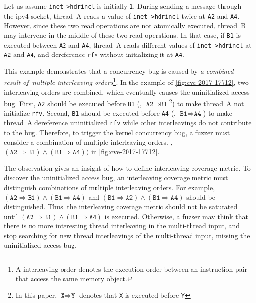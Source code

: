 Let us assume \texttt{inet->hdrincl} is initially \texttt{1}.
%
During sending a message through the ipv4 socket, thread~A reads a
value of \texttt{inet->hdrincl} twice at \texttt{A2} and \texttt{A4}.
%
However, since these two read operations are not atomically executed,
thread~B may intervene in the middle of these two read operations.
%
In that case, if \texttt{B1} is executed between \texttt{A2} and
\texttt{A4}, thread~A reads different values of \texttt{inet->hdrincl}
at \texttt{A2} and \texttt{A4}, and dereference \texttt{rfv} without
initializing it at \texttt{A4}.


%
This example demonstrates that a concurrency bug is caused by \textit{a combined
  result of multiple interleaving orders}\footnote{A interleaving order
denotes the execution order between an instruction pair that access
the same memory object.}.
%
In the example of \autoref{fig:cve-2017-17712}, two interleaving orders
are combined, which eventually causes the uninitialized access bug.
%
First, \texttt{A2} should be executed before \texttt{B1} (\ie,
$\texttt{A2} \Rightarrow \texttt{B1}$\footnote{In this paper,
  $\texttt{X} \Rightarrow \texttt{Y}$ denotes that \texttt{X} is
  executed before \texttt{Y}}) to make thread~A not initialize
\texttt{rfv}.
%
Second, \texttt{B1} should be executed before \texttt{A4} (\ie,
$\texttt{B1} \Rightarrow \texttt{A4}$) to make thread~A dereference
uninitialized \texttt{rfv} while other interleavings do not 
contribute to the bug.
%
Therefore, to trigger the kernel concurrency bug, a fuzzer must
consider a combination of multiple interleaving orders. \eg, 
$(\texttt{A2} \Rightarrow \texttt{B1}) \wedge (\texttt{B1} \Rightarrow
\texttt{A4}))$ in \autoref{fig:cve-2017-17712}.


The observation gives an insight of how to define interleaving coverage metric.
To discover the uninitialized access bug, 
an interleaving coverage metric must distinguish combinations of multiple interleaving orders.
%
For example, $(\texttt{A2} \Rightarrow \texttt{B1}) \wedge (\texttt{B1} \Rightarrow
\texttt{A4})$ and $(\texttt{B1} \Rightarrow \texttt{A2}) \wedge (\texttt{B1} \Rightarrow
\texttt{A4})$ should be distinguished.
%
Thus, the interleaving coverage metric should not be saturated until
$(\texttt{A2} \Rightarrow \texttt{B1}) \wedge (\texttt{B1} \Rightarrow
\texttt{A4})$ is executed.
%
Otherwise, a fuzzer may think that there is no more interesting thread
interleaving in the multi-thread input, and stop searching for new
thread interleavings of the multi-thread input, missing the
uninitialized access bug.


